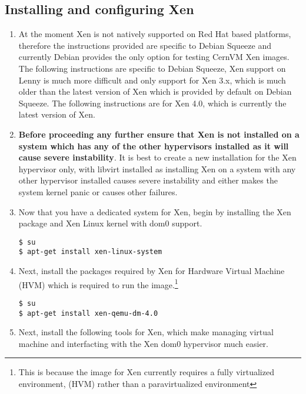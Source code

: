 \subsection{Installing and configuring Xen}
\label{sec:debianxen}
\begin{enumerate}

\item	At the moment Xen is not natively supported on Red Hat based platforms, therefore the instructions provided
			are specific to Debian Squeeze and currently Debian provides the only option for testing CernVM Xen images.
			The following instructions are specific to Debian Squeeze, Xen support on Lenny is much more difficult and
			only support for Xen 3.x, which is much older than the latest version of Xen which is provided by
			default on Debian Squeeze. The following instructions are for Xen 4.0, which is currently the latest version of
			Xen.
			
\item	{\bf Before proceeding any further ensure that Xen is not installed on a system which has any of the other 
			hypervisors installed as it will cause severe instability}. It is best to create a new installation for the Xen
			hypervisor only, with libvirt installed as installing Xen on a system with any other hypervisor installed
			causes severe instability and either makes the system kernel panic or causes other failures. 
			
\item	Now that you have a dedicated system for Xen, begin by installing the Xen package and Xen Linux 
			kernel with dom0 support.

\lstset{language=bash,caption=Installing Xen Package and Kernel}
\begin{lstlisting}
$ su
$ apt-get install xen-linux-system
\end{lstlisting}

\item	Next, install the packages required by Xen for Hardware Virtual Machine (HVM) which is required to run the
			\cernvm image.\footnote{This is because the \cernvm image for Xen currently requires a fully virtualized environment,
			(HVM) rather than a paravirtualized environment}

\lstset{language=bash,caption=Installing Packages for HVM Support}
\begin{lstlisting}
$ su
$ apt-get install xen-qemu-dm-4.0
\end{lstlisting}

\item	Next, install the following tools for Xen, which make managing virtual machine and interfacting with the Xen
			dom0 hypervisor much easier.


\end{enumerate}
